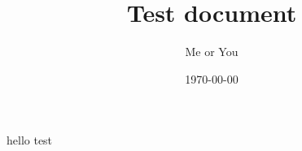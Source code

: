 \documentclass{article}
\title{Test document}
\date{1970-00-00}
\author{Me or You}
\begin{document}
    \maketitle
    \newpage
    hello test
\end{document}
